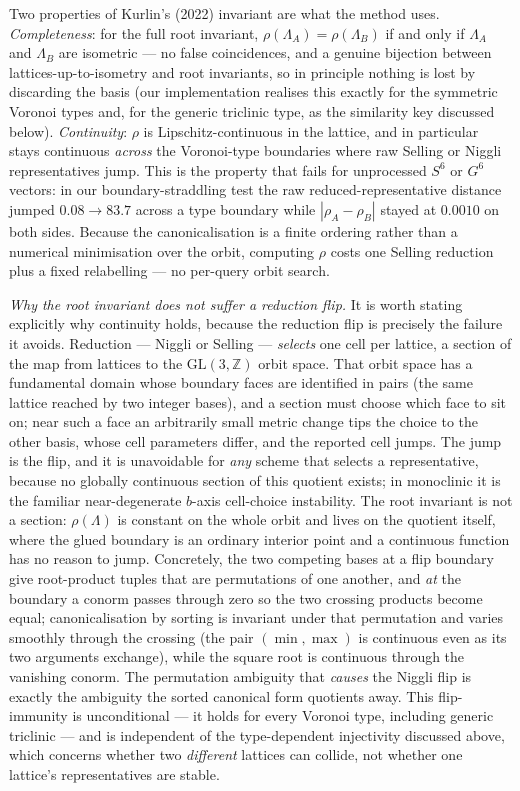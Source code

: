 \documentclass[11pt]{article}
\newcommand{\rootinv}{\rho}
\begin{document}
Two properties of Kurlin's (2022) invariant are what the method uses.
\emph{Completeness}: for the full root invariant,
$\rootinv(\Lambda_A) = \rootinv(\Lambda_B)$ if and only if
$\Lambda_A$ and $\Lambda_B$ are isometric --- no false coincidences, and a genuine
bijection between lattices-up-to-isometry and root invariants, so in principle
nothing is lost by discarding the basis (our implementation realises this exactly
for the symmetric Voronoi types and, for the generic triclinic type, as the
similarity key discussed below). \emph{Continuity}: $\rootinv$ is Lipschitz-continuous in
the lattice, and in particular stays continuous \emph{across} the Voronoi-type
boundaries where raw Selling or Niggli representatives jump. This is the property
that fails for unprocessed $S^6$ or $G^6$ vectors: in our boundary-straddling
test the raw reduced-representative distance jumped $0.08 \to 83.7$ across a type
boundary while $|\rootinv_A - \rootinv_B|$ stayed at $0.0010$ on both sides.
Because the canonicalisation is a finite ordering rather than a numerical
minimisation over the orbit, computing $\rootinv$ costs one Selling reduction plus
a fixed relabelling --- no per-query orbit search.

\emph{Why the root invariant does not suffer a reduction flip.} It is worth
stating explicitly why continuity holds, because the reduction flip is precisely
the failure it avoids. Reduction --- Niggli or Selling --- \emph{selects} one
cell per lattice, a section of the map from lattices to the
$\mathrm{GL}(3,\mathbb{Z})$ orbit space. That orbit space has a fundamental domain
whose boundary faces are identified in pairs (the same lattice reached by two
integer bases), and a section must choose which face to sit on; near such a face
an arbitrarily small metric change tips the choice to the other basis, whose cell
parameters differ, and the reported cell jumps. The jump is the flip, and it is
unavoidable for \emph{any} scheme that selects a representative, because no
globally continuous section of this quotient exists; in monoclinic it is the
familiar near-degenerate $b$-axis cell-choice instability. The root invariant is
not a section: $\rootinv(\Lambda)$ is constant on the whole orbit and lives on the
quotient itself, where the glued boundary is an ordinary interior point and a
continuous function has no reason to jump. Concretely, the two competing bases at
a flip boundary give root-product tuples that are permutations of one another, and
\emph{at} the boundary a conorm passes through zero so the two crossing products
become equal; canonicalisation by sorting is invariant under that permutation and
varies smoothly through the crossing (the pair $(\min,\max)$ is continuous even as
its two arguments exchange), while the square root is continuous through the
vanishing conorm. The permutation ambiguity that \emph{causes} the Niggli flip is
exactly the ambiguity the sorted canonical form quotients away. This flip-immunity
is unconditional --- it holds for every Voronoi type, including generic triclinic
--- and is independent of the type-dependent injectivity discussed above, which
concerns whether two \emph{different} lattices can collide, not whether one
lattice's representatives are stable.
\end{document}
